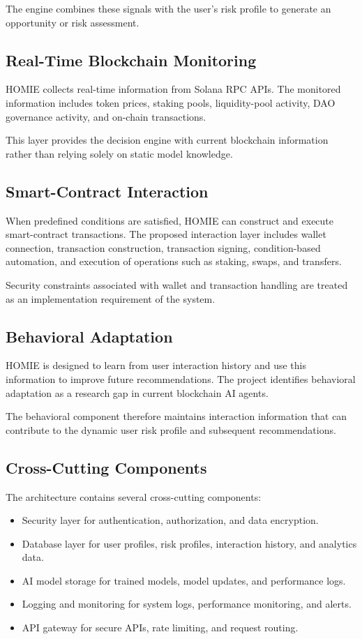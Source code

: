 \documentclass[conference]{IEEEtran}
\begin{document}
The engine combines these signals with the user's risk profile to generate an opportunity or risk assessment.

\subsection{Real-Time Blockchain Monitoring}

HOMIE collects real-time information from Solana RPC APIs. The monitored information includes token prices, staking pools, liquidity-pool activity, DAO governance activity, and on-chain transactions.

This layer provides the decision engine with current blockchain information rather than relying solely on static model knowledge.

\subsection{Smart-Contract Interaction}

When predefined conditions are satisfied, HOMIE can construct and execute smart-contract transactions. The proposed interaction layer includes wallet connection, transaction construction, transaction signing, condition-based automation, and execution of operations such as staking, swaps, and transfers.

Security constraints associated with wallet and transaction handling are treated as an implementation requirement of the system.

\subsection{Behavioral Adaptation}

HOMIE is designed to learn from user interaction history and use this information to improve future recommendations. The project identifies behavioral adaptation as a research gap in current blockchain AI agents.

The behavioral component therefore maintains interaction information that can contribute to the dynamic user risk profile and subsequent recommendations.

\subsection{Cross-Cutting Components}

The architecture contains several cross-cutting components:
\begin{itemize}
    \item Security layer for authentication, authorization, and data encryption.
    \item Database layer for user profiles, risk profiles, interaction history, and analytics data.
    \item AI model storage for trained models, model updates, and performance logs.
    \item Logging and monitoring for system logs, performance monitoring, and alerts.
    \item API gateway for secure APIs, rate limiting, and request routing.
\end{itemize}
\end{document}
